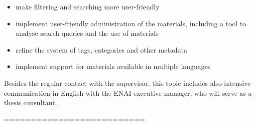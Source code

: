 \documentclass[
  digital,     %
  oneside,     %
  nosansbold,  %
  colorbold, %
  lof,         %
  lot,         %
]{fithesis4}
\begin{document}
\begin{itemize}
    \item make filtering and searching more user-friendly
    \item implement user-friendly administration of the materials, including a tool to
    analyse search queries and the use of materials
    \item refine the system of tags, categories and other metadata
    \item implement support for materials available in multiple languages
\end{itemize}

Besides the regular contact with the supervisor, this topic includes also intensive
communication in English with the ENAI executive manager, who will serve as a thesis
consultant.

==========================

\printbibliography[heading=bibintoc] %


\end{document}
